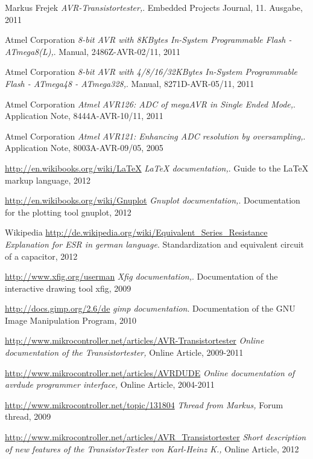 \documentclass[12pt,a4paper,oneside,english]{report}
\begin{document}
\begin{thebibliography}{99}

Markus Frejek
\emph{AVR-Transistortester,}.
Embedded Projects Journal,
11. Ausgabe,
2011

Atmel Corporation
\emph{8-bit AVR with 8KBytes In-System Programmable Flash - ATmega8(L),}.
Manual,
2486Z-AVR-02/11,
2011

Atmel Corporation
\emph{8-bit AVR with 4/8/16/32KBytes In-System Programmable Flash - ATmega48 - ATmega328,}.
Manual,
8271D-AVR-05/11,
2011

Atmel Corporation
\emph{Atmel AVR126: ADC of megaAVR in Single Ended Mode,}.
Application Note,
8444A-AVR-10/11,
2011

Atmel Corporation
\emph{Atmel AVR121: Enhancing ADC resolution by oversampling,}.
Application Note,
8003A-AVR-09/05,
2005

\url{http://en.wikibooks.org/wiki/LaTeX}
\emph{LaTeX documentation,}.
Guide to the LaTeX markup language,
2012

\url{http://en.wikibooks.org/wiki/Gnuplot}
\emph{Gnuplot documentation,}.
Documentation for the plotting tool gnuplot,
2012

Wikipedia
\url{http://de.wikipedia.org/wiki/Equivalent_Series_Resistance}
\emph{Explanation for ESR in german language}.
Standardization and equivalent circuit of a capacitor,
2012


\url{http://www.xfig.org/userman}
\emph{Xfig documentation,}.
Documentation of the interactive drawing tool xfig,
2009

\url{http://docs.gimp.org/2.6/de}
\emph{gimp documentation}.
Documentation of the GNU Image Manipulation Program,
2010

\url{http://www.mikrocontroller.net/articles/AVR-Transistortester}
\emph{Online documentation of the Transistortester,}
Online Article,
2009-2011

\url{http://www.mikrocontroller.net/articles/AVRDUDE}
\emph{Online documentation of avrdude programmer interface,}
Online Article,
2004-2011

\url{http://www.mikrocontroller.net/topic/131804}
\emph{Thread from Markus,}
Forum thread, 
2009

\url{http://www.mikrocontroller.net/articles/AVR\_Transistortester}
\emph{Short description of new features of the TransistorTester von Karl-Heinz K.,}
Online Article,
2012


\end{thebibliography}
\end{document}
